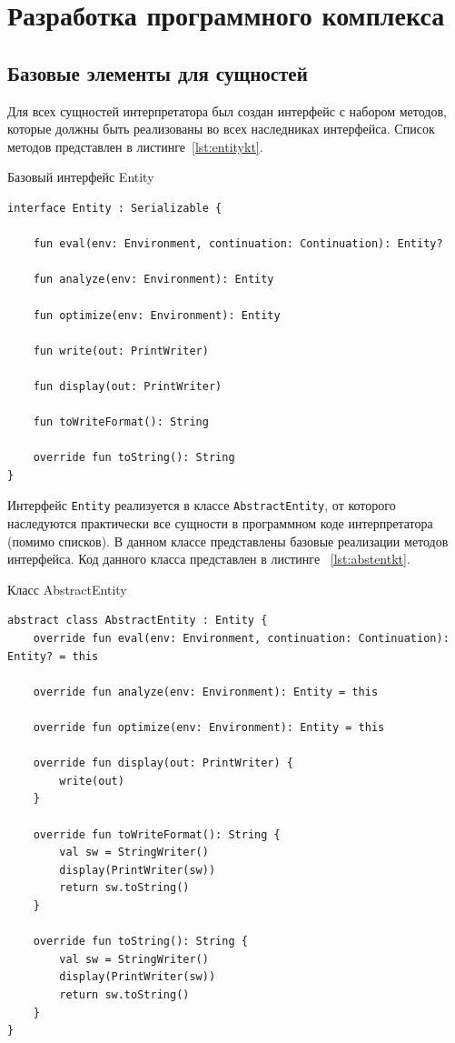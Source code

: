 \documentclass[14pt, russian]{scrartcl}
\begin{document}
\section{Разработка программного комплекса}

\subsection{Базовые элементы для сущностей}

Для всех сущностей интерпретатора был создан интерфейс с набором методов, которые должны быть реализованы во всех наследниках интерфейса. Список методов представлен в листинге~\ref{lst:entitykt}.

\begin{listing}[!htb]
\caption{Базовый интерфейс Entity}
\label{lst:entitykt}
\begin{verbatim}
interface Entity : Serializable {

    fun eval(env: Environment, continuation: Continuation): Entity?

    fun analyze(env: Environment): Entity

    fun optimize(env: Environment): Entity

    fun write(out: PrintWriter)

    fun display(out: PrintWriter)

    fun toWriteFormat(): String

    override fun toString(): String
}
\end{verbatim}
\end{listing}

Интерфейс \texttt{Entity} реализуется в классе \texttt{AbstractEntity}, от которого наследуются практически все сущности в программном коде интерпретатора (помимо списков). В данном классе представлены базовые реализации методов интерфейса. Код данного класса представлен в листинге ~\ref{lst:abstentkt}.

\begin{listing}[!htb]
\caption{Класс AbstractEntity}
\label{lst:abstentkt}
\begin{verbatim}
abstract class AbstractEntity : Entity {
    override fun eval(env: Environment, continuation: Continuation): Entity? = this

    override fun analyze(env: Environment): Entity = this

    override fun optimize(env: Environment): Entity = this

    override fun display(out: PrintWriter) {
        write(out)
    }

    override fun toWriteFormat(): String {
        val sw = StringWriter()
        display(PrintWriter(sw))
        return sw.toString()
    }

    override fun toString(): String {
        val sw = StringWriter()
        display(PrintWriter(sw))
        return sw.toString()
    }
}

\end{verbatim}
\end{listing}
\end{document}
